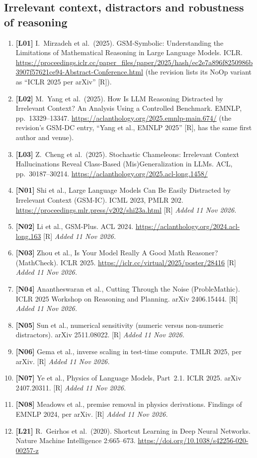 \documentclass[10pt,a4paper]{article}
\begin{document}
{\subsection*{Irrelevant context, distractors and robustness of reasoning}
\begin{enumerate}[label={},leftmargin=0pt]
\item \textbf{[L01]} I.~Mirzadeh et al.\ (2025). GSM-Symbolic: Understanding the Limitations of Mathematical
Reasoning in Large Language Models. ICLR.
\url{https://proceedings.iclr.cc/paper_files/paper/2025/hash/ec2e7a896f8250986b3907f57621ce94-Abstract-Conference.html}
(the revision lists its NoOp variant as ``ICLR 2025 per arXiv'' [R]).
\item \textbf{[L02]} M.~Yang et al.\ (2025). How Is LLM Reasoning Distracted by Irrelevant Context? An Analysis
Using a Controlled Benchmark. EMNLP, pp.~13329--13347. \url{https://aclanthology.org/2025.emnlp-main.674/}
(the revision's GSM-DC entry, ``Yang et al., EMNLP 2025'' [R], has the same first author and venue).
\item \textbf{[L03]} Z.~Cheng et al.\ (2025). Stochastic Chameleons: Irrelevant Context Hallucinations Reveal
Class-Based (Mis)Generalization in LLMs. ACL, pp.~30187--30214. \url{https://aclanthology.org/2025.acl-long.1458/}
\item \textbf{[N01]} Shi et al., Large Language Models Can Be Easily Distracted by Irrelevant Context (GSM-IC). ICML 2023, PMLR 202. \url{https://proceedings.mlr.press/v202/shi23a.html} [R] \emph{Added 11 Nov 2026.}
\item \textbf{[N02]} Li et al., GSM-Plus. ACL 2024. \url{https://aclanthology.org/2024.acl-long.163} [R] \emph{Added 11 Nov 2026.}
\item \textbf{[N03]} Zhou et al., Is Your Model Really A Good Math Reasoner? (MathCheck). ICLR 2025. \url{https://iclr.cc/virtual/2025/poster/28416} [R] \emph{Added 11 Nov 2026.}
\item \textbf{[N04]} Anantheswaran et al., Cutting Through the Noise (ProbleMathic). ICLR 2025 Workshop on Reasoning and Planning. arXiv 2406.15444. [R] \emph{Added 11 Nov 2026.}
\item \textbf{[N05]} Sun et al., numerical sensitivity (numeric versus non-numeric distractors). arXiv 2511.08022.
[R] \emph{Added 11 Nov 2026.}
\item \textbf{[N06]} Gema et al., inverse scaling in test-time compute. TMLR 2025, per arXiv. [R] \emph{Added 11 Nov
2026.}
\item \textbf{[N07]} Ye et al., Physics of Language Models, Part~2.1. ICLR 2025. arXiv 2407.20311. [R] \emph{Added 11 Nov 2026.}
\item \textbf{[N08]} Meadows et al., premise removal in physics derivations. Findings of EMNLP 2024, per arXiv. [R]
\emph{Added 11 Nov 2026.}
\item \textbf{[L21]} R.~Geirhos et al.\ (2020). Shortcut Learning in Deep Neural Networks. Nature Machine
Intelligence 2:665--673. \url{https://doi.org/10.1038/s42256-020-00257-z}
\end{enumerate}

}
\end{document}
